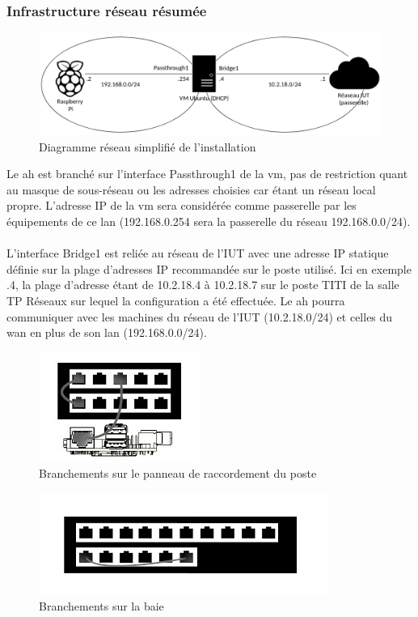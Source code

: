 \documentclass[a4paper]{article}
\begin{document}
\subsubsection{Infrastructure réseau résumée}
\label{sec:rzo}
\begin{figure}[!ht]
    \centering
    \includegraphics[scale=0.4]{rzo.png}
    \caption{Diagramme réseau simplifié de l'installation}
\label{fig:my_label}
\end{figure}
Le \acrshort{ah} est branché sur l'interface Passthrough1 de la \acrshort{vm}, pas de restriction quant au masque de sous-réseau ou les adresses choisies car étant un réseau local propre. L'adresse IP de la \acrshort{vm} sera considérée comme passerelle par les équipements de ce \gls{lan} (192.168.0.254 sera la passerelle du réseau 192.168.0.0/24).\\\\L'interface Bridge1 est reliée au réseau de l'IUT avec une adresse IP statique définie sur la plage d'adresses IP recommandée sur le poste utilisé. Ici en exemple .4, la plage d'adresse étant de 10.2.18.4 à 10.2.18.7 sur le poste TITI de la salle TP Réseaux sur lequel la configuration a été effectuée. Le \acrshort{ah} pourra communiquer avec les machines du réseau de l'IUT (10.2.18.0/24) et celles du \gls{wan} en plus de son \gls{lan} (192.168.0.0/24).
\begin{figure}[!ht]
    \centering
    \includegraphics[scale=2]{poste.jpg}
    \caption{Branchements sur le panneau de raccordement du poste}
    \label{fig:poste}
\end{figure}
\begin{figure}[!ht]
    \centering
    \includegraphics[scale=0.9]{baie2.png}
    \caption{Branchements sur la baie}
    \label{fig:baie}
\end{figure}
\newline
\newpage
\end{document}
